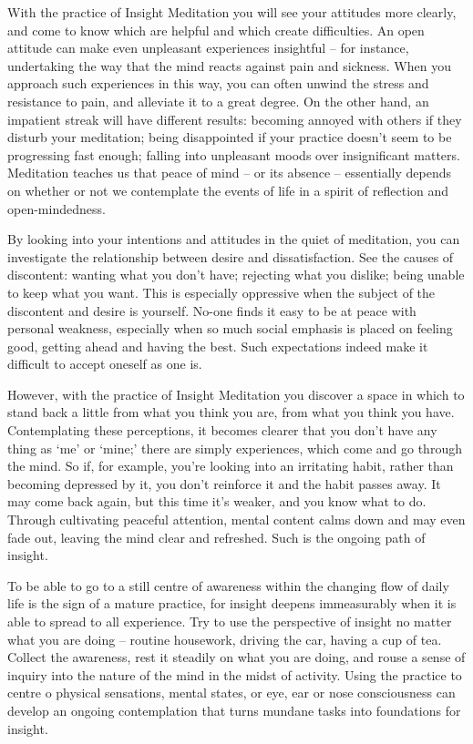 
With the practice of Insight Meditation you will see your attitudes more
clearly, and come to know which are helpful and which create
difficulties. An open attitude can make even unpleasant experiences
insightful -- for instance, undertaking the way that the mind reacts
against pain and sickness. When you approach such experiences in this
way, you can often unwind the stress and resistance to pain, and
alleviate it to a great degree. On the other hand, an impatient streak
will have different results: becoming annoyed with others if they
disturb your meditation; being disappointed if your practice doesn't
seem to be progressing fast enough; falling into unpleasant moods over
insignificant matters. Meditation teaches us that peace of mind -- or
its absence -- essentially depends on whether or not we contemplate the
events of life in a spirit of reflection and open-mindedness.

By looking into your intentions and attitudes in the quiet of
meditation, you can investigate the relationship between desire and
dissatisfaction. See the causes of discontent: wanting what you don't
have; rejecting what you dislike; being unable to keep what you want.
This is especially oppressive when the subject of the discontent and
desire is yourself. No-one finds it easy to be at peace with personal
weakness, especially when so much social emphasis is placed on feeling
good, getting ahead and having the best. Such expectations indeed make
it difficult to accept oneself as one is.

However, with the practice of Insight Meditation you discover a space in
which to stand back a little from what you think you are, from what you
think you have. Contemplating these perceptions, it becomes clearer that
you don't have any thing as `me' or `mine;' there are simply
experiences, which come and go through the mind. So if, for example,
you're looking into an irritating habit, rather than becoming depressed
by it, you don't reinforce it and the habit passes away. It may come
back again, but this time it's weaker, and you know what to do. Through
cultivating peaceful attention, mental content calms down and may even
fade out, leaving the mind clear and refreshed. Such is the ongoing path
of insight.

To be able to go to a still centre of awareness within the changing flow
of daily life is the sign of a mature practice, for insight deepens
immeasurably when it is able to spread to all experience. Try to use the
perspective of insight no matter what you are doing -- routine housework,
driving the car, having a cup of tea. Collect the awareness, rest it
steadily on what you are doing, and rouse a sense of inquiry into the
nature of the mind in the midst of activity. Using the practice to
centre o physical sensations, mental states, or eye, ear or nose
consciousness can develop an ongoing contemplation that turns mundane
tasks into foundations for insight.

